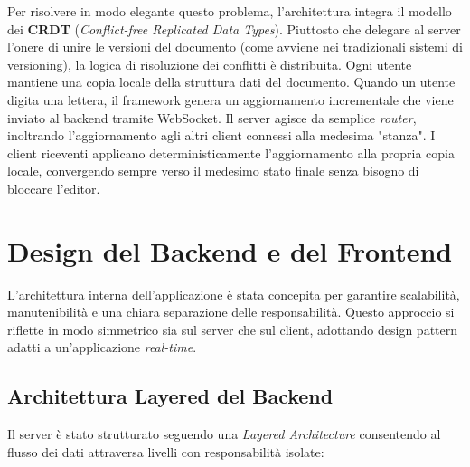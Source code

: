 \documentclass[11pt,a4paper]{report}
\begin{document}
Per risolvere in modo elegante questo problema, l'architettura integra il modello dei \textbf{CRDT} (\textit{Conflict-free Replicated Data Types}). Piuttosto che delegare al server l'onere di unire le versioni del documento (come avviene nei tradizionali sistemi di versioning), la logica di risoluzione dei conflitti è distribuita. 
Ogni utente mantiene una copia locale della struttura dati del documento. Quando un utente digita una lettera, il framework genera un aggiornamento incrementale che viene inviato al backend tramite WebSocket. Il server agisce da semplice \textit{router}, inoltrando l'aggiornamento agli altri client connessi alla medesima "stanza". I client riceventi applicano deterministicamente l'aggiornamento alla propria copia locale, convergendo sempre verso il medesimo stato finale senza bisogno di bloccare l'editor.

\section{Design del Backend e del Frontend}
L'architettura interna dell'applicazione è stata concepita per garantire scalabilità, manutenibilità e una chiara separazione delle responsabilità. Questo approccio si riflette in modo simmetrico sia sul server che sul client, adottando design pattern adatti a un'applicazione \textit{real-time}.

\subsection{Architettura Layered del Backend}
Il server è stato strutturato seguendo una \textit{Layered Architecture} consentendo al flusso dei dati attraversa livelli con responsabilità isolate:
\end{document}
